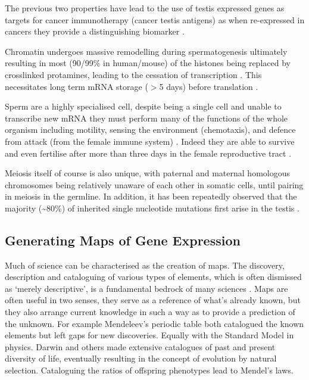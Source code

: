  The previous two properties have lead to the use of testis expressed genes as targets for cancer immunotherapy (cancer testis antigens) as when re-expressed in cancers they provide a distinguishing biomarker \parencite{Whitehurst2014Cause}.

Chromatin undergoes massive remodelling during spermatogenesis ultimately resulting in most (90/99\% in human/mouse) of the histones being replaced by crosslinked protamines, leading to the cessation of transcription \parencite{Rathke2014Chromatin}.
This necessitates long term mRNA storage ($>$5 days) before translation \parencite{Kleene2013Connecting}.

Sperm are a highly specialised cell, despite being a single cell and unable to transcribe new mRNA they must perform many of the functions of the whole organism including motility, sensing the environment (chemotaxis), and defence from attack (from the female immune system) \parencite{Kaupp2008Mechanisms, Thompson1992Leukocytic}.
Indeed they are able to survive and even fertilise after more than three days in the female reproductive tract \parencite{Gould1984Assessment,Wilcox1995Timing}.

Meiosis itself of course is also unique, with paternal and maternal homologous chromosomes being relatively unaware of each other in somatic cells, until pairing in meiosis in the germline.
In addition, it has been repeatedly observed that the majority (\textasciitilde80\%) of inherited single nucleotide mutations first arise in the testis \parencite{Kong2012Rate, Michaelson2012WholeGenome, Goldmann2016Parentoforiginspecific, Rahbari2016Timing, Jonsson2017Parental}.



\subsection{Generating Maps of Gene Expression}
Much of science can be characterised as the creation of maps.
The discovery, description and cataloguing of various types of elements, which is often dismissed as `merely descriptive', is a fundamental bedrock of many sciences \parencite{Grimaldi2007Why}.
Maps are often useful in two senses, they serve as a reference of what's already known, but they also arrange current knowledge in such a way as to provide a prediction of the unknown.
For example Mendeleev's periodic table both catalogued the known elements but left gaps for new discoveries.
Equally with the Standard Model in physics.
Darwin and others made extensive catalogues of past and present diversity of life, eventually resulting in the concept of evolution by natural selection.
Cataloguing the ratios of offspring phenotypes lead to Mendel's laws.

